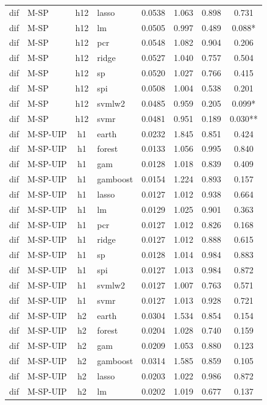 \begin{ThreePartTable}
\begin{longtable}[t]{llclcccc}
dif & M-SP & h12 & lasso & 0.0538 & 1.063 & 0.898 & 0.731\\
dif & M-SP & h12 & lm & 0.0505 & 0.997 & 0.489 & 0.088*\\
dif & M-SP & h12 & pcr & 0.0548 & 1.082 & 0.904 & 0.206\\
dif & M-SP & h12 & ridge & 0.0527 & 1.040 & 0.757 & 0.504\\
dif & M-SP & h12 & sp & 0.0520 & 1.027 & 0.766 & 0.415\\
dif & M-SP & h12 & spi & 0.0508 & 1.004 & 0.538 & 0.201\\
dif & M-SP & h12 & svmlw2 & 0.0485 & 0.959 & 0.205 & 0.099*\\
dif & M-SP & h12 & svmr & 0.0481 & 0.951 & 0.189 & 0.030**\\
\addlinespace
dif & M-SP-UIP & h1 & earth & 0.0232 & 1.845 & 0.851 & 0.424\\
dif & M-SP-UIP & h1 & forest & 0.0133 & 1.056 & 0.995 & 0.840\\
dif & M-SP-UIP & h1 & gam & 0.0128 & 1.018 & 0.839 & 0.409\\
dif & M-SP-UIP & h1 & gamboost & 0.0154 & 1.224 & 0.893 & 0.157\\
dif & M-SP-UIP & h1 & lasso & 0.0127 & 1.012 & 0.938 & 0.664\\
dif & M-SP-UIP & h1 & lm & 0.0129 & 1.025 & 0.901 & 0.363\\
dif & M-SP-UIP & h1 & pcr & 0.0127 & 1.012 & 0.826 & 0.168\\
dif & M-SP-UIP & h1 & ridge & 0.0127 & 1.012 & 0.888 & 0.615\\
dif & M-SP-UIP & h1 & sp & 0.0128 & 1.014 & 0.984 & 0.883\\
dif & M-SP-UIP & h1 & spi & 0.0127 & 1.013 & 0.984 & 0.872\\
dif & M-SP-UIP & h1 & svmlw2 & 0.0127 & 1.007 & 0.763 & 0.571\\
dif & M-SP-UIP & h1 & svmr & 0.0127 & 1.013 & 0.928 & 0.721\\
\addlinespace
dif & M-SP-UIP & h2 & earth & 0.0304 & 1.534 & 0.854 & 0.154\\
dif & M-SP-UIP & h2 & forest & 0.0204 & 1.028 & 0.740 & 0.159\\
dif & M-SP-UIP & h2 & gam & 0.0209 & 1.053 & 0.880 & 0.123\\
dif & M-SP-UIP & h2 & gamboost & 0.0314 & 1.585 & 0.859 & 0.105\\
dif & M-SP-UIP & h2 & lasso & 0.0203 & 1.022 & 0.986 & 0.872\\
dif & M-SP-UIP & h2 & lm & 0.0202 & 1.019 & 0.677 & 0.137\\

\end{longtable}
\end{ThreePartTable}
